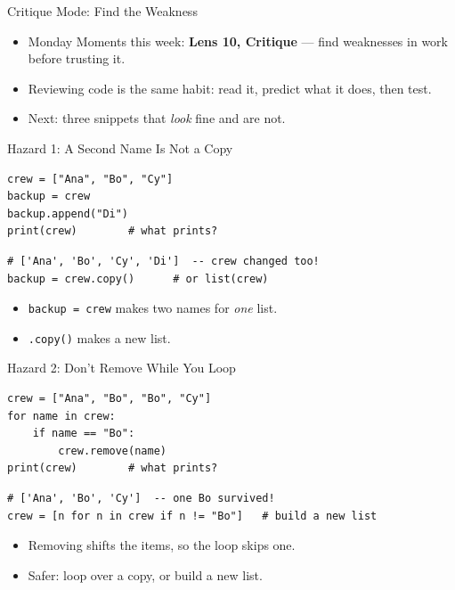 \documentclass{beamer}
\begin{document}
\begin{frame}{Critique Mode: Find the Weakness}
\begin{itemize}
    \item Monday Moments this week: \textbf{Lens 10, Critique} --- find weaknesses in work before trusting it.
    \item Reviewing code is the same habit: read it, predict what it does, then test.
    \item Next: three snippets that \emph{look} fine and are not.
\end{itemize}
\end{frame}

\begin{frame}[fragile]{Hazard 1: A Second Name Is Not a Copy}
\begin{verbatim}
crew = ["Ana", "Bo", "Cy"]
backup = crew
backup.append("Di")
print(crew)        # what prints?
\end{verbatim}
\pause
\begin{verbatim}
# ['Ana', 'Bo', 'Cy', 'Di']  -- crew changed too!
backup = crew.copy()      # or list(crew)
\end{verbatim}
\begin{itemize}
    \item \texttt{backup = crew} makes two names for \emph{one} list.
    \item \texttt{.copy()} makes a new list.
\end{itemize}
\end{frame}

\begin{frame}[fragile]{Hazard 2: Don't Remove While You Loop}
\begin{verbatim}
crew = ["Ana", "Bo", "Bo", "Cy"]
for name in crew:
    if name == "Bo":
        crew.remove(name)
print(crew)        # what prints?
\end{verbatim}
\pause
\begin{verbatim}
# ['Ana', 'Bo', 'Cy']  -- one Bo survived!
crew = [n for n in crew if n != "Bo"]   # build a new list
\end{verbatim}
\begin{itemize}
    \item Removing shifts the items, so the loop skips one.
    \item Safer: loop over a copy, or build a new list.
\end{itemize}
\end{frame}
\end{document}
